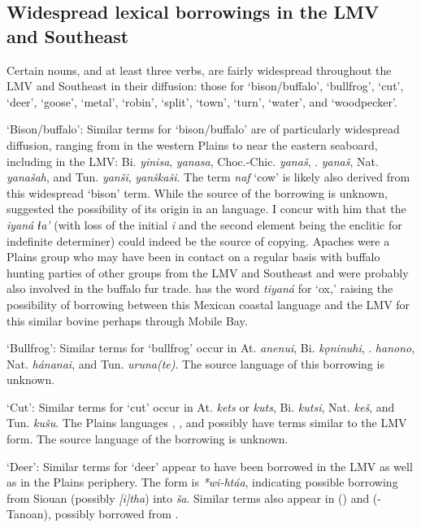 \documentclass[output=paper]{LSP/langsci}
\begin{document}
\subsection{Widespread lexical borrowings in the LMV and Southeast}

Certain nouns, and at least three verbs, are fairly widespread throughout the LMV and Southeast in their diffusion: those for `bison/buffalo', `bullfrog', `cut', `deer', `goose', `metal', `robin', `split', `town', `turn', `water', and `woodpecker'. 
 


\ea \parbox[t]{.9\textwidth}{`Bison/buffalo': Similar terms for `bison/buffalo' are of particularly widespread diffusion, ranging from  in the western Plains to  near the eastern seaboard, including in the LMV: Bi. \emph{yinisa}, \emph{yanasa}, Choc.-Chic. \emph{yanaš}, . \emph{yanaš}, Nat. \emph{yanašah}, and Tun. \emph{yanši}, \emph{yanškaši}. The  term \emph{naf} `cow' is likely also derived from this widespread `bison' term. While the source of the borrowing is unknown, \citet[166]{Taylor1976b} suggested the possibility of its origin in an  language. I concur with him that the  \emph{iyaná ɬa’} (with loss of the initial \emph{i} and the second element being the enclitic for indefinite determiner) could indeed be the source of copying. Apaches were a Plains group who may have been in contact on a regular basis with buffalo hunting parties of other groups from the LMV and Southeast and were probably also involved in the buffalo fur trade.  has the word \emph{tiyaná} for `ox,' raising the possibility of borrowing between this Mexican  coastal language and the LMV for this similar bovine perhaps through Mobile Bay.}
\z

\ea  \parbox[t]{.9\textwidth}{`Bullfrog': Similar terms for `bullfrog' occur in At. \emph{anenui}, Bi. \emph{kǫninuhi}, . \emph{hanono}, Nat. \emph{hánanai}, and Tun. \emph{uruna(te)}. The source language of this borrowing is unknown.}
\z

\ea  \parbox[t]{.9\textwidth}{`Cut': Similar terms for `cut' occur in At. \emph{kets} or \emph{kuts}, Bi. \emph{kutsi}, Nat. \emph{keš}, and Tun. \emph{kušu}. The Plains languages , , and possibly  have terms similar to the LMV form. The source language of the borrowing is unknown.}
\z

\ea  \parbox[t]{.9\textwidth}{`Deer': Similar terms for `deer' appear to have been borrowed in the LMV as well as in the Plains periphery. The  form is \emph{*wi-htáa}, indicating possible borrowing from Siouan (possibly  \emph{[i]tha}) into  \emph{ša}. Similar terms also appear in  () and  (-Tanoan), possibly borrowed from . }
\z
\end{document}
